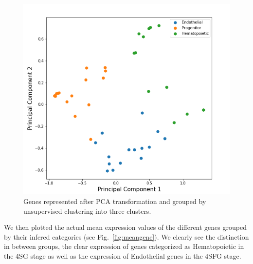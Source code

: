 \documentclass[a4paper,12pt]{book}
\theoremstyle{break}
\begin{document}
	\begin{figure}[h!]
		\centering
		\includegraphics[height = 0.4\textheight]{../Preliminary/genepca.png}
		\caption{Genes represented after PCA transformation and grouped by unsupervised clustering into three clusters.}
		\label{fig:genePCA}
	\end{figure}
		We then plotted the actual mean expression values of the different genes grouped by their infered categories (see Fig.~\ref{fig:meangene}). We clearly see the distinction in between groups, the clear expression of genes categorized as Hematopoietic in the 4SG stage as well as the expression of Endothelial genes in the 4SFG stage. 
\end{document}
